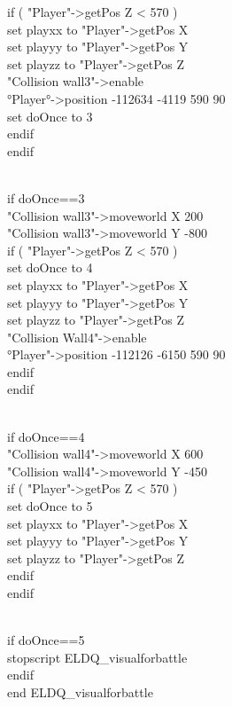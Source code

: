 \documentclass[
]{article}
\begin{document}
if ( "Player"-\textgreater getPos Z \textless{} 570 )\\
set playxx to "Player"-\textgreater getPos X\\
set playyy to "Player"-\textgreater getPos Y\\
set playzz to "Player"-\textgreater getPos Z\\
"Collision wall3"-\textgreater enable\\
°Player°-\textgreater position -112634 -4119 590 90\\
set doOnce to 3\\
endif\\
endif\\
\strut \\
if doOnce==3\\
"Collision wall3"-\textgreater moveworld X 200\\
"Collision wall3"-\textgreater moveworld Y -800\\
if ( "Player"-\textgreater getPos Z \textless{} 570 )\\
set doOnce to 4\\
set playxx to "Player"-\textgreater getPos X\\
set playyy to "Player"-\textgreater getPos Y\\
set playzz to "Player"-\textgreater getPos Z\\
"Collision Wall4"-\textgreater enable\\
°Player"-\textgreater position -112126 -6150 590 90\\
endif\\
endif\\
\strut \\
if doOnce==4\\
"Collision wall4"-\textgreater moveworld X 600\\
"Collision wall4"-\textgreater moveworld Y -450\\
if ( "Player"-\textgreater getPos Z \textless{} 570 )\\
set doOnce to 5\\
set playxx to "Player"-\textgreater getPos X\\
set playyy to "Player"-\textgreater getPos Y\\
set playzz to "Player"-\textgreater getPos Z\\
endif\\
endif\\
\strut \\
if doOnce==5\\
stopscript ELDQ\_visualforbattle\\
endif\\
end ELDQ\_visualforbattle
\end{document}
